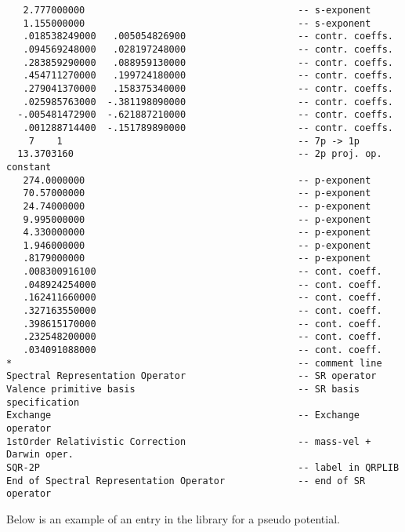 {\begin{verbatim}
   2.777000000                                      -- s-exponent
   1.155000000                                      -- s-exponent
   .018538249000   .005054826900                    -- contr. coeffs.
   .094569248000   .028197248000                    -- contr. coeffs.
   .283859290000   .088959130000                    -- contr. coeffs.
   .454711270000   .199724180000                    -- contr. coeffs.
   .279041370000   .158375340000                    -- contr. coeffs.
   .025985763000  -.381198090000                    -- contr. coeffs.
  -.005481472900  -.621887210000                    -- contr. coeffs.
   .001288714400  -.151789890000                    -- contr. coeffs.
    7    1                                          -- 7p -> 1p
  13.3703160                                        -- 2p proj. op. constant
   274.0000000                                      -- p-exponent
   70.57000000                                      -- p-exponent
   24.74000000                                      -- p-exponent
   9.995000000                                      -- p-exponent
   4.330000000                                      -- p-exponent
   1.946000000                                      -- p-exponent
   .8179000000                                      -- p-exponent
   .008300916100                                    -- cont. coeff.
   .048924254000                                    -- cont. coeff.
   .162411660000                                    -- cont. coeff.
   .327163550000                                    -- cont. coeff.
   .398615170000                                    -- cont. coeff.
   .232548200000                                    -- cont. coeff.
   .034091088000                                    -- cont. coeff.
*                                                   -- comment line
Spectral Representation Operator                    -- SR operator
Valence primitive basis                             -- SR basis specification
Exchange                                            -- Exchange operator
1stOrder Relativistic Correction                    -- mass-vel + Darwin oper.
SQR-2P                                              -- label in QRPLIB
End of Spectral Representation Operator             -- end of SR operator
\end{verbatim}
}
 
Below is an example of an entry in the  library for a pseudo potential.
\vskip 0.2cm

